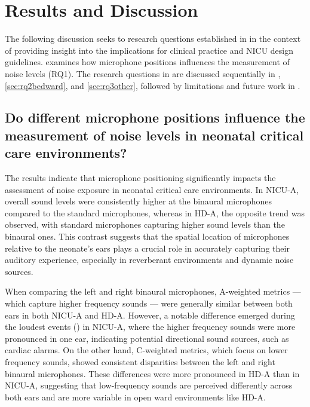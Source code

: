 \section{Results and Discussion}
\label{sec:discussion}

The following discussion seeks to research questions established in  in the context of providing insight into the implications for clinical practice and NICU design guidelines.  examines how microphone positions influences the measurement of noise levels (RQ1). 
{
The research questions in  are discussed sequentially in , \ref{sec:rq2bedward}, and \ref{sec:rq3other}, followed by limitations and future work in .
} 

\subsection{Do different microphone positions influence the measurement of noise levels in neonatal critical care environments?} \label{sec:rq1micpos}

The results indicate that microphone positioning significantly impacts the assessment of noise exposure in neonatal critical care environments. In NICU-A, overall sound levels were consistently higher at the binaural microphones compared to the standard microphones, whereas in HD-A, the opposite trend was observed, with standard microphones capturing higher sound levels than the binaural ones. This contrast suggests that the spatial location of microphones relative to the neonate’s ears plays a crucial role in accurately capturing their auditory experience, especially in reverberant environments and dynamic noise sources.

When comparing the left and right binaural microphones, A-weighted metrics — which capture higher frequency sounds — were generally similar between both ears in both NICU-A and HD-A. However, a notable difference emerged during the loudest events () in NICU-A, where the higher frequency sounds were more pronounced in one ear, indicating potential directional sound sources, such as cardiac alarms. On the other hand, C-weighted metrics, which focus on lower frequency sounds, showed consistent disparities between the left and right binaural microphones. These differences were more pronounced in HD-A than in NICU-A, suggesting that low-frequency sounds are perceived differently across both ears and are more variable in open ward environments like HD-A.

